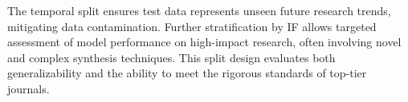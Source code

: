 The temporal split ensures test data represents unseen future research trends, mitigating data contamination. Further stratification by IF allows targeted assessment of model performance on high-impact research, often involving novel and complex synthesis techniques. This split design evaluates both generalizability and the ability to meet the rigorous standards of top-tier journals.


